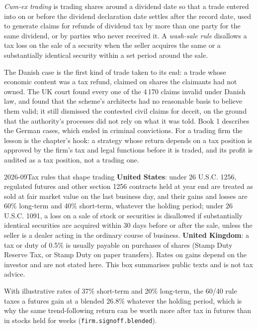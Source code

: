\begin{definition}\label{def:fm:finance-product-control-and-tax:cumex}
\emph{Cum-ex trading} is trading shares around a dividend date so that a trade entered into on or before the dividend
declaration date settles after the record date, used to generate claims for refunds of dividend tax by more than one party for the same dividend,
or by parties who never received it. A \emph{wash-sale rule} disallows a tax loss on the sale of a security when the seller
acquires the same or a substantially identical security within a set period around the sale.
\end{definition}

The Danish case is the first kind of trade taken to its end: a trade whose economic content was a tax refund, claimed on shares the claimants had
not owned. The UK court found every one of the 4\,170 claims invalid under Danish law, and found that the scheme's architects had no reasonable basis to
believe them valid; it still dismissed the contested civil claims for deceit, on the ground that the authority's processes did not rely on what
it was told. Book 1 describes the German cases, which ended in criminal convictions. For a trading firm the lesson is the chapter's hook: a strategy
whose return depends on a tax position is approved by the firm's tax and legal functions before it is traded, and its profit is audited as a tax
position, not a trading one.

\begin{dated}{2026-09}{Tax rules that shape trading}\label{dat:fm:finance-product-control-and-tax:tax}
\textbf{United States}: under 26 U.S.C. 1256, regulated futures and other section 1256 contracts held at year end are treated as sold at fair
market value on the last business day, and their gains and losses are 60\% long-term and 40\% short-term, whatever the holding period; under 26
U.S.C. 1091, a loss on a sale of stock or securities is disallowed if substantially identical securities are acquired within 30 days before or
after the sale, unless the seller is a dealer acting in the ordinary course of business. \textbf{United Kingdom}: a tax or duty of 0.5\% is
usually payable on purchases of shares (Stamp Duty Reserve Tax, or Stamp Duty on paper transfers). Rates on gains depend on the investor and are
not stated here. This box summarises public texts and is not tax advice.
\end{dated}

With illustrative rates of 37\% short-term and 20\% long-term, the 60/40 rule taxes a futures gain at a blended 26.8\% whatever the holding
period, which is why the same trend-following return can be worth more after tax in futures than in stocks held for weeks
(\texttt{firm.signoff.blended}).

